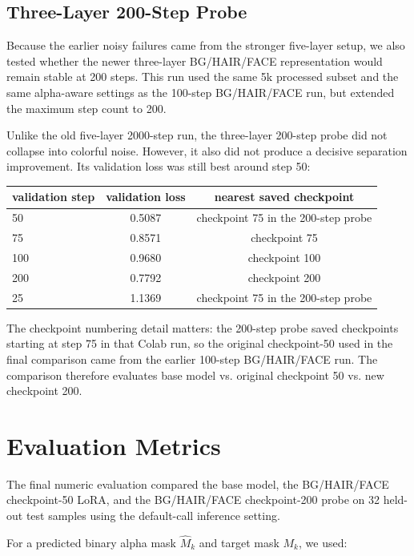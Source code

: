 \documentclass[11pt]{article}
\begin{document}
\subsection{Three-Layer 200-Step Probe}

Because the earlier noisy failures came from the stronger five-layer setup, we
also tested whether the newer three-layer BG/HAIR/FACE representation would remain
stable at 200 steps. This run used the same 5k processed subset and the same
alpha-aware settings as the 100-step BG/HAIR/FACE run, but extended the maximum
step count to 200.

Unlike the old five-layer 2000-step run, the three-layer 200-step probe did not
collapse into colorful noise. However, it also did not produce a decisive
separation improvement. Its validation loss was still best around step 50:

\begin{center}
\begin{tabular}{lcc}
\toprule
validation step & validation loss & nearest saved checkpoint \\
\midrule
50 & 0.5087 & checkpoint 75 in the 200-step probe \\
75 & 0.8571 & checkpoint 75 \\
100 & 0.9680 & checkpoint 100 \\
200 & 0.7792 & checkpoint 200 \\
25 & 1.1369 & checkpoint 75 in the 200-step probe \\
\bottomrule
\end{tabular}
\end{center}

The checkpoint numbering detail matters: the 200-step probe saved checkpoints
starting at step 75 in that Colab run, so the original checkpoint-50 used in the
final comparison came from the earlier 100-step BG/HAIR/FACE run. The comparison
therefore evaluates base model vs. original checkpoint 50 vs. new checkpoint 200.

\section{Evaluation Metrics}

The final numeric evaluation compared the base model, the BG/HAIR/FACE
checkpoint-50 LoRA, and the BG/HAIR/FACE checkpoint-200 probe on 32 held-out test
samples using the default-call inference setting.

For a predicted binary alpha mask $\hat{M}_k$ and target mask $M_k$, we used:
\end{document}
